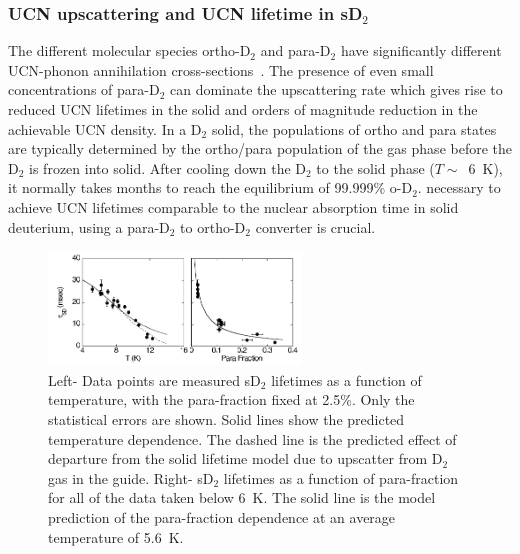 \subsubsection{UCN upscattering and UCN lifetime in sD$_2$~\cite{Liu2000,Morris2002}}


The different molecular species ortho-D$_2$ and para-D$_2$ have
significantly different UCN-phonon annihilation
cross-sections~\cite{Liu2000}. The presence of even small
concentrations of para-D$_2$ can dominate the upscattering rate which
gives rise to reduced UCN lifetimes in the solid and orders of
magnitude reduction in the achievable UCN density.  In a D$_2$ solid,
the populations of ortho and para states are typically determined by
the ortho/para population of the gas phase before the D$_2$ is frozen
into solid.  After cooling down the D$_2$ to the solid phase
($T \sim$~6~K), it normally takes months to reach the equilibrium of
99.999\% o-D$_2$.
necessary to achieve UCN lifetimes comparable to the nuclear
absorption time in solid deuterium, using a para-D$_2$ to ortho-D$_2$
converter is crucial.


\begin{figure}[h!]
\begin{center}
   \includegraphics[width=0.6\textwidth]{Morris2002.PNG} \caption{\cite{Morris2002}
    Left- Data points are measured sD$_2$ lifetimes as a function of
    temperature, with the para-fraction fixed at 2.5\%. Only the
    statistical errors are shown. Solid lines show the predicted
    temperature dependence. The dashed line is the predicted effect of
    departure from the solid lifetime model due to upscatter from
    D$_2$ gas in the guide. Right- sD$_2$ lifetimes as a function of
    para-fraction for all of the data taken below 6~K. The solid line
    is the model prediction of the para-fraction dependence at an
    average temperature of 5.6~K.  }
    \label{fig:Morris2002}
    \end{center}
\end{figure} 



